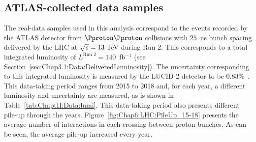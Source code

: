 \subsection{ATLAS-collected data samples}
\label{sec:ChaptH:Data_and_MC:Data}
The real-data samples used in this analysis correspond to the events
recorded by the ATLAS detector from $\Pproton\Pproton$ collisions with $25$~ns bunch spacing
delivered by the LHC at $\sqrt{s}=13\,$TeV during Run 2. 
This corresponds to a total integrated luminosity of $L^{\text{Run 2}} = 140$~fb$^{-1}$ (see Section~\ref{sec:Chap3.1:Data:DeliveredLuminosity}).
The uncertainty corresponding to this integrated luminosity is measured by the LUCID-2
detector to be $0.83\%$~\cite{ATLAS:2022hro, Avoni:2018iuv}. This data-taking period ranges from 2015 to 2018 and, for each year,
a different luminosity and uncertainty are measured, as is shown in Table~\ref{tab:ChaptH:Data:lumi}.
This data-taking period also presents different pile-up through the years. 
Figure~\ref{fig:Chap6:LHC:PileUp_15-18} presents the average number of interactions
in each crossing between proton bunches. As can be seen, the average pile-up increased
every year. 


